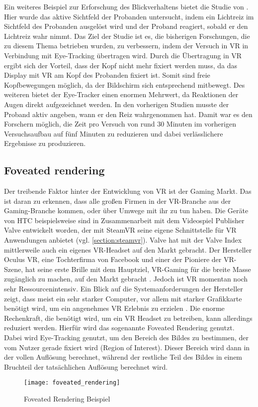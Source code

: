 Ein weiteres Beispiel zur Erforschung des Blickverhaltens bietet die Studie von \citeauthor{K.Hotta.2019}. Hier wurde das aktive Sichtfeld der Probanden untersucht, indem ein Lichtreiz im Sichtfeld des Probanden ausgelöst wird und der Proband reagiert, sobald er den Lichtreiz wahr nimmt. Das Ziel der Studie ist es, die bisherigen Forschungen, die zu diesem Thema betrieben wurden, zu verbessern, indem der Versuch in VR in Verbindung mit Eye-Tracking übertragen wird. Durch die Übertragung in VR ergibt sich der Vorteil, dass der Kopf nicht mehr fixiert werden muss, da das Display mit VR am Kopf des Probanden fixiert ist. Somit sind freie Kopfbewegungen möglich, da der Bildschirm sich entsprechend mitbewegt. Des weiteren bietet der Eye-Tracker einen enormen Mehrwert, da Reaktionen der Augen direkt aufgezeichnet werden. In den vorherigen Studien musste der Proband aktiv angeben, wann er den Reiz wahrgenommen hat. Damit war es den Forschern möglich, die Zeit pro Versuch von rund 30 Minuten im vorherigen Versuchsaufbau auf fünf Minuten zu reduzieren und dabei verlässlichere Ergebnisse zu produzieren.\cite{K.Hotta.2019}

\subsection{Foveated rendering}
\label{section:foveated}
Der treibende Faktor hinter der Entwicklung von VR ist der Gaming Markt. Das ist daran zu erkennen, dass alle großen Firmen in der VR-Branche aus der Gaming-Branche kommen, oder über Umwege mit ihr zu tun haben. Die Geräte von HTC beispielsweise sind in Zusammenarbeit mit dem Videospiel Publisher Valve entwickelt worden, der mit SteamVR seine eigene Schnittstelle für VR Anwendungen anbietet (vgl. \autoref{section:steamvr}). Valve hat mit der Valve Index mittlerweile auch ein eigenes VR-Headset auf den Markt gebracht. Der Hersteller Oculus VR, eine Tochterfirma von Facebook und einer der Pioniere der VR-Szene, hat seine erste Brille mit dem Hauptziel, VR-Gaming für die breite Masse zugänglich zu machen, auf den Markt gebracht \cite{OculusKickstarter}. Jedoch ist VR momentan noch sehr Ressourcenintensiv. Ein Blick auf die Systemanforderungen der Hersteller zeigt, dass meist ein sehr starker Computer, vor allem mit starker Grafikkarte benötigt wird, um ein angenehmes VR Erlebnis zu erzielen \cite{Lang.2019}. Die enorme Rechenkraft, die benötigt wird, um ein VR Headset zu betreiben, kann allerdings reduziert werden. Hierfür wird das sogenannte Foveated Rendering genutzt. Dabei wird Eye-Tracking genutzt, um den Bereich des Bildes zu bestimmen, der vom Nutzer gerade fixiert wird (Region of Interest). Dieser Bereich wird dann in der vollen Auflösung berechnet, während der restliche Teil des Bildes in einem Bruchteil der tatsächlichen Auflösung berechnet wird. 
\begin{figure}
	\centering
	\texttt{[image: foveated\_rendering]}
	\caption[Foveated Rendering Beispiel]{Foveated Rendering Beispiel \cite{Albert.2017}}
	\label{fig:foveated}
\end{figure}


